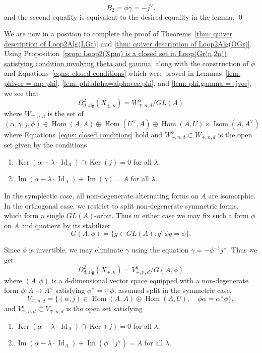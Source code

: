 \message{ !name(Bryan-Vakil.tex)}\documentclass{amsart}
\theoremstyle{definition}
\newcommand{\Hom}{\operatorname{Hom}}
\newcommand{\Ker}{\operatorname{Ker}}
\newcommand{\im}{\operatorname{Im}}
\newcommand{\alg}{\mathsf{alg}}
\newcommand{\open}{\mathsf{o}}
\newcommand{\LoopTwo}{\Omega^{2}_{d,\alg}}
\newcommand{\Id}{\operatorname{Id}}
\newcommand{\Xpm}{X_{\pm,n}}
\begin{document}
\[
B_{2} = \phi\gamma  = -j^{\vee}.
\]
and the second equality is equivalent to the desired equality in the lemma.
\qed 

We are now in a position to complete the proof of Theorems~\ref{thm:
quiver description of Loop2Alg(LGr)} and \ref{thm: quiver description
of Loop2Alg(OGr)}. Using Proposition~\ref{prop: Loop2(Xpm) is a closed set in
Loop(Gr(n,2n)) satisfying condition involving theta and gamma} along
with the construction of $\phi$ and Equations~\eqref{eqns: closed
conditions} which were proved in Lemmas~\ref{lem: phivee = mp phi},
\ref{lem: phi.alpha=alphavee.phi}, and \ref{lem: phi.gamma = -jvee},
we see that 
\[
\LoopTwo (\Xpm ) = W^{\open}_{\mp,n,d} / GL(A)
\]
where $W_{\mp ,n,d}$ is the set of
\[
(\alpha ,\gamma ,j,\phi )\in \Hom (A,A)\oplus \Hom
(U^{\vee},A)\oplus  \Hom (A,U)\times \operatorname{Isom}(A,A^{\vee})
\]
where Equations~\eqref{eqns: closed conditions} hold and $W^{\open}_{\mp
,n,d}\subset W_{\mp ,n,d}$ is the open set given by the conditions

\bigskip

\begin{enumerate}
\item $\Ker (\alpha -\lambda \cdot \Id_{A})\cap \Ker (j) = 0$ for all
$\lambda$.
\item  $\im (\alpha -\lambda \cdot \Id_{A})+  \im (\gamma )=A$ for
all $\lambda$.
\end{enumerate}

\bigskip

In the symplectic case, all non-degenerate alternating forms on $A$
are isomorphic. In the orthogonal case, we restrict to split
non-degenerate symmetric forms, which form a single $GL(A)$-orbit.
Thus in either case we may fix such a form $\phi $ on $A$ and quotient
by its stabilizer
\[
G(A,\phi)=\{g\in GL(A):g^\vee \phi g=\phi\}.
\]


Since $\phi$ is invertible, we may eliminate $\gamma$ using the
equation $\gamma =-\phi^{-1} j^{\vee}$. Thus we get
\[
\LoopTwo (\Xpm ) = V_{\mp ,n,d}^{\open}/G(A,\phi )
\]
where $(A,\phi )$ is a $d$-dimensional vector space equipped with a 
non-degenerate form $\phi :A\to A^{\vee}$ satisfying $\phi^{\vee}=\mp
\phi$, assumed split in the symmetric case, 
\[
V_{\mp ,n,d} = \{(\alpha ,j)\in \Hom (A,A)\oplus \Hom (A,U),\quad \phi
\alpha =\alpha^{\vee}\phi \}, 
\]
and $V^{\open}_{\mp, n,d}\subset V_{\mp, n,d}$ is the open set satisfying

\bigskip

\begin{enumerate}
\item $\Ker (\alpha -\lambda \cdot \Id_{A})\cap \Ker (j) = 0$ for all
$\lambda$.
\item  $\im (\alpha -\lambda \cdot \Id_{A})+  \im (\phi^{-1}j^{\vee} )=A$ for
all $\lambda$.
\end{enumerate}
  
\end{document}
